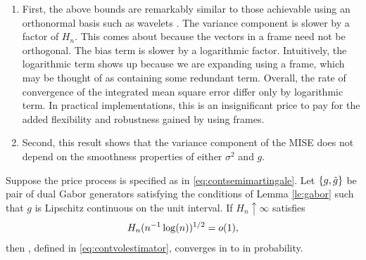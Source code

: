 \begin{remark}\mbox{}
  \begin{enumerate}  
    \item First, the above bounds are remarkably similar to those achievable using an orthonormal basis such as wavelets \citep{GenonCatalot1992}. The variance component is slower by a factor of $H_n$. This comes about because the vectors in a frame need not be orthogonal. The bias term is slower by a logarithmic factor. Intuitively, the logarithmic term shows up because we are expanding \sv using a frame, which may be thought of as containing some redundant term. Overall, the rate of convergence of the integrated mean square error differ only by logarithmic term. In practical implementations, this is an insignificant price to pay for the added flexibility and robustness gained by using frames. 
    \item Second, this result shows that the variance component of the MISE does not depend on the smoothness properties of either $\sigma^2$ and $g$.  
  \end{enumerate}
\end{remark}
\begin{prop}\label{pro:finite}
  Suppose the  price process is specified as in \eqref{eq:contsemimartingale}. Let $\{g, \tilde{g}\}$ be pair of dual Gabor generators satisfying the conditions of Lemma \eqref{le:gabor} such that $g$ is Lipschitz continuous on the unit interval. 
If $H_n \uparrow \infty$ satisfies 
  \begin{align}
    H_n (n^{-1} \log(n))^{1/2} = o(1),\notag
    \label{}
  \end{align}
  then
  \svnx, defined in \eqref{eq:contvolestimator}, converges in \Ltwo to \sv in probability.
\end{prop}





